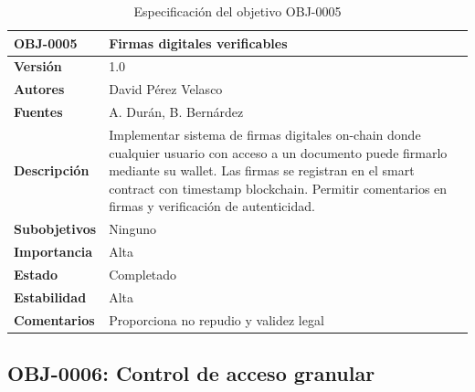 \documentclass[11pt, a4paper]{article}
\begin{document}
\begin{table}[H]
    \centering
    \small
    \begin{tabular}{|p{4cm}|p{10cm}|}
    \hline
    \textbf{OBJ-0005} & Firmas digitales verificables \\
    \hline
    \textbf{Versión} & 1.0 \\
    \hline
    \textbf{Autores} & David Pérez Velasco \\
    \hline
    \textbf{Fuentes} & A. Durán, B. Bernárdez \\
    \hline
    \textbf{Descripción} & Implementar sistema de firmas digitales on-chain donde cualquier usuario con acceso a un documento puede firmarlo mediante su wallet. Las firmas se registran en el smart contract con timestamp blockchain. Permitir comentarios en firmas y verificación de autenticidad. \\
    \hline
    \textbf{Subobjetivos} & Ninguno \\
    \hline
    \textbf{Importancia} & Alta \\
    \hline
    \textbf{Estado} & Completado \\
    \hline
    \textbf{Estabilidad} & Alta \\
    \hline
    \textbf{Comentarios} & Proporciona no repudio y validez legal \\
    \hline
    \end{tabular}
    \caption{Especificación del objetivo OBJ-0005}
\end{table}

\subsection{OBJ-0006: Control de acceso granular}
\end{document}
